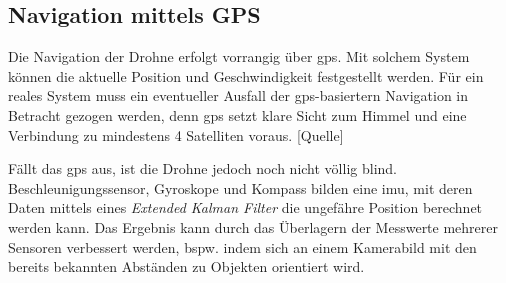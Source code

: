 
\subsection{Navigation mittels GPS}
Die Navigation der Drohne erfolgt vorrangig über \gls{gps}. Mit solchem System können die aktuelle Position und Geschwindigkeit festgestellt werden. Für ein reales System muss ein eventueller Ausfall der \gls{gps}-basiertern Navigation in Betracht gezogen werden, denn \gls{gps} setzt klare Sicht zum Himmel und eine Verbindung zu mindestens 4 Satelliten voraus. [Quelle]

Fällt das \gls{gps} aus, ist die Drohne jedoch noch nicht völlig blind. Beschleunigungssensor, Gyroskope und Kompass bilden eine \gls{imu}, mit deren Daten mittels eines \textit{Extended Kalman Filter} die ungefähre Position berechnet werden kann. Das Ergebnis kann durch das Überlagern der Messwerte mehrerer Sensoren verbessert werden, bspw. indem sich an einem Kamerabild mit den bereits bekannten Abständen zu Objekten orientiert wird. 

